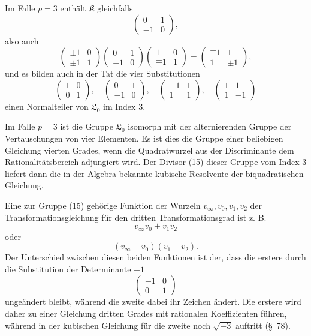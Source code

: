 \documentclass[11pt]{article}
\providecommand{\Lzero}{\mathfrak L_0}
\providecommand{\Kgrp}{\mathfrak K}
\begin{document}
Im Falle $p=3$ enthält $\Kgrp$ gleichfalls
\[
 \begin{pmatrix}0&1\\-1&0\end{pmatrix},
\]
also auch
\[
 \begin{pmatrix}\pm1&0\\\pm1&1\end{pmatrix}
 \begin{pmatrix}0&1\\-1&0\end{pmatrix}
 \begin{pmatrix}1&0\\\mp1&1\end{pmatrix}
 =
 \begin{pmatrix}\mp1&1\\1&\pm1\end{pmatrix},
\]
und es bilden auch in der Tat die vier Substitutionen
\begin{equation}
 \begin{pmatrix}1&0\\0&1\end{pmatrix},
 \quad
 \begin{pmatrix}0&1\\-1&0\end{pmatrix},
 \quad
 \begin{pmatrix}-1&1\\1&1\end{pmatrix},
 \quad
 \begin{pmatrix}1&1\\1&-1\end{pmatrix}
\tag{15}
\end{equation}
einen Normalteiler von $\Lzero$ im Index $3$.

Im Falle $p=3$ ist die Gruppe $\Lzero$ isomorph mit der alternierenden Gruppe der Vertauschungen von vier Elementen. Es ist dies die Gruppe einer beliebigen Gleichung vierten Grades, wenn die Quadratwurzel aus der Discriminante dem Rationalitätsbereich adjungiert wird. Der Divisor (15) dieser Gruppe vom Index $3$ liefert dann die in der Algebra bekannte kubische Resolvente der biquadratischen Gleichung.

Eine zur Gruppe (15) gehörige Funktion der Wurzeln $v_\infty,v_0,v_1,v_2$ der Transformationsgleichung für den dritten Transformationsgrad ist z. B.
\[
 v_\infty v_0+v_1v_2
\]
oder
\[
 (v_\infty-v_0)(v_1-v_2).
\]
Der Unterschied zwischen diesen beiden Funktionen ist der, dass die erstere durch die Substitution der Determinante $-1$
\[
 \begin{pmatrix}-1&0\\0&1\end{pmatrix}
\]
ungeändert bleibt, während die zweite dabei ihr Zeichen ändert. Die erstere wird daher zu einer Gleichung dritten Grades mit rationalen Koeffizienten führen, während in der kubischen Gleichung für die zweite noch $\sqrt{-3}$ auftritt (\S~78).
\end{document}
